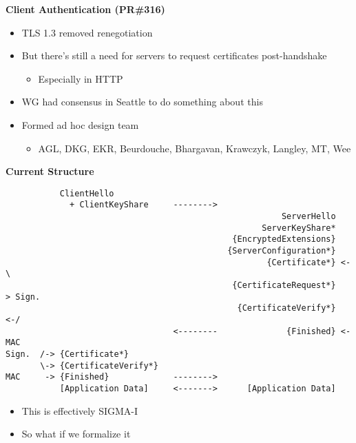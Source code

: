 \documentclass[helvetica]{seminar}
\newcommand{\heading}[1]{%
  \begin{center} 
    \large\bf 
    #1 
  \end{center} 
  \vspace{.4 in}}
\begin{document}
\begin{slide}
\heading{Client Authentication (PR\#316)}

\begin{itemize}
\item TLS 1.3 removed renegotiation
\item But there's still a need for servers to request certificates post-handshake
  \begin{itemize}
  \item Especially in HTTP
  \end{itemize}

\item WG had consensus in Seattle to do something about this
\item Formed ad hoc design team
  \begin{itemize}
  \item AGL, DKG, EKR, Beurdouche, Bhargavan, Krawczyk, Langley, MT, Wee
  \end{itemize}
\end{itemize}
\end{slide}

\begin{slide}
\heading{Current Structure}

\vspace{-3ex}
\begin{footnotesize}
\begin{verbatim}
           ClientHello
             + ClientKeyShare     -------->
                                                        ServerHello
                                                    ServerKeyShare*
                                              {EncryptedExtensions}
                                             {ServerConfiguration*}
                                                     {Certificate*} <-\
                                              {CertificateRequest*}    > Sign.
                                               {CertificateVerify*} <-/
                                  <--------              {Finished} <-   MAC
Sign.  /-> {Certificate*}
       \-> {CertificateVerify*}
MAC     -> {Finished}             -------->
           [Application Data]     <------->      [Application Data]
\end{verbatim}
\end{footnotesize}

\begin{itemize}
\item This is effectively SIGMA-I
\item So what if we formalize it
\end{itemize}
\end{slide}
\end{document}
